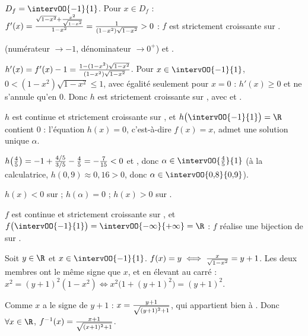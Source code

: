 \collerici
\begin{corrigeprof}[22]
\be
\item \be \item $D_f=\intervOO{-1}{1}$. Pour $x\in D_f$ :
	$f'(x)=\frac{\sqrt{1-x^2}+\frac{x^2}{\sqrt{1-x^2}}}{1-x^2}=\frac{1}{(1-x^2)\sqrt{1-x^2}}>0$ : $f$ est strictement croissante sur .
	\par {} (numérateur $\to -1$, dénominateur $\to 0^+$) et .
	\begin{center}
	\end{center}
	\item $h'(x)=f'(x)-1=\frac{1-(1-x^2)\sqrt{1-x^2}}{(1-x^2)\sqrt{1-x^2}}$. Pour $x\in\intervOO{-1}{1}$, $0<(1-x^2)\sqrt{1-x^2}\leq 1$, avec égalité seulement pour $x=0$ : $h'(x)\geq 0$ et ne s'annule qu'en $0$. Donc $h$ est strictement croissante sur , avec  et .
	\item $h$ est continue et strictement croissante sur , et $h\big(\intervOO{-1}{1}\big)=\R$ contient $0$ : l'équation $h(x)=0$, c'est-à-dire $f(x)=x$, admet une solution unique $\alpha$.
	\par $h\big(\frac{4}{5}\big)=-1+\frac{4/5}{3/5}-\frac{4}{5}=-\frac{7}{15}<0$ et , donc $\alpha\in\intervOO{\f{4}{5}}{1}$ (à la calculatrice, $h(0{,}9)\approx 0{,}16>0$, donc $\alpha\in\intervOO{0{,}8}{0{,}9}$).
	\item $h(x)<0$ sur  ; $h(\alpha)=0$ ; $h(x)>0$ sur .\ee
\item \be \item $f$ est continue et strictement croissante sur , et $f\big(\intervOO{-1}{1}\big)=\intervOO{-\infty}{+\infty}=\R$ : $f$ réalise une bijection de  sur \R.
	\item Soit $y\in\R$ et $x\in\intervOO{-1}{1}$. $f(x)=y\iff\frac{x}{\sqrt{1-x^2}}=y+1$. Les deux membres ont le même signe que $x$, et en élevant au carré : $x^2=(y+1)^2(1-x^2)\iff x^2\big(1+(y+1)^2\big)=(y+1)^2$.
	\par Comme $x$ a le signe de $y+1$ : $x=\frac{y+1}{\sqrt{(y+1)^2+1}}$, qui appartient bien à . Donc $\forall x\in\R$, $f^{-1}(x)=\frac{x+1}{\sqrt{(x+1)^2+1}}$.\ee
\ee
\end{corrigeprof}
